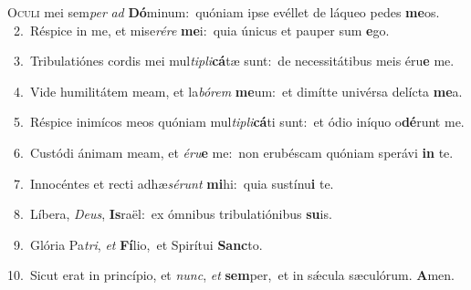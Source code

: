 \lettrine{\initial\textcolor{\initialcolor}{O}}{culi} mei sem\textit{per} \textit{ad} \textbf{Dó}\-minum:~\star quóniam ipse evéllet de láqueo pedes \textbf{me}\-os.\\
{\numbfont\textcolor{\numbcolor}{~2.}}~Réspice in me, et mise\-\textit{ré}\-\textit{re} \textbf{me}\-i:~\star quia únicus et pauper sum \textbf{e}\-go.\par
{\numbfont\textcolor{\numbcolor}{~3.}}~Tribulatiónes cordis mei mul\-\textit{ti}\-\textit{pli}\textbf{cá}tæ sunt:~\star de necessitátibus meis éru\textbf{e} me.\par
{\numbfont\textcolor{\numbcolor}{~4.}}~Vide humilitátem meam, et la\-\textit{bó}\-\textit{rem} \textbf{me}\-um:~\star et dimítte univérsa delícta \textbf{me}\-a.\par
{\numbfont\textcolor{\numbcolor}{~5.}}~Réspice inimícos meos quóniam mul\-\textit{ti}\-\textit{pli}\textbf{cá}ti sunt:~\star et ódio iníquo o\-\textbf{dé}\-runt me.\par
{\numbfont\textcolor{\numbcolor}{~6.}}~Custódi ánimam meam, et \textit{é}\-\textit{ru}\textbf{e} me:~\star non erubéscam quóniam sperávi \textbf{in} te.\par
{\numbfont\textcolor{\numbcolor}{~7.}}~Innocéntes et recti adhæ\-\textit{sé}\-\textit{runt} \textbf{mi}\-hi:~\star quia sustínu\textbf{i} te.\par
{\numbfont\textcolor{\numbcolor}{~8.}}~Líbera, \textit{De}\-\textit{us}, \textbf{Is}\-raël:~\star ex ómnibus tribulatiónibus \textbf{su}\-is.\par
{\numbfont\textcolor{\numbcolor}{~9.}}~Glória Pa\-\textit{tri}\-, \textit{et} \textbf{Fí}\-lio,~\star et Spirítui \textbf{Sanc}\-to.\par
{\numbfont\textcolor{\numbcolor}{10.}}~Sicut erat in princípio, et \textit{nunc}\-, \textit{et} \textbf{sem}\-per,~\star et in sǽcula sæculórum. \textbf{A}\-men.\par
